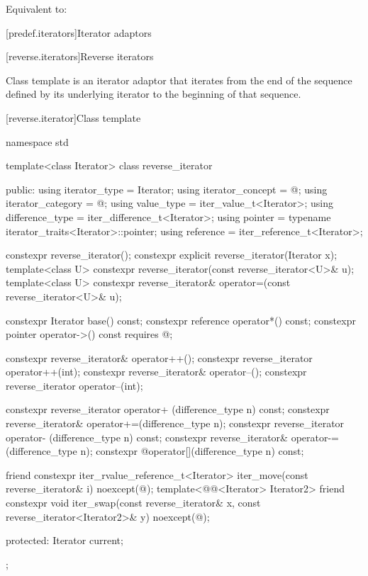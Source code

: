 \begin{itemdescr}
\pnum
\effects
Equivalent to: 
\end{itemdescr}

[predef.iterators]{Iterator adaptors}

[reverse.iterators]{Reverse iterators}

\pnum
Class template  is an iterator adaptor that iterates from the end of the sequence defined by its underlying iterator to the beginning of that sequence.

[reverse.iterator]{Class template }

%
\begin{codeblock}
namespace std {
  template<class Iterator>
  class reverse_iterator {
  public:
    using iterator_type     = Iterator;
    using iterator_concept  = @\seebelow@;
    using iterator_category = @\seebelow@;
    using value_type        = iter_value_t<Iterator>;
    using difference_type   = iter_difference_t<Iterator>;
    using pointer           = typename iterator_traits<Iterator>::pointer;
    using reference         = iter_reference_t<Iterator>;

    constexpr reverse_iterator();
    constexpr explicit reverse_iterator(Iterator x);
    template<class U> constexpr reverse_iterator(const reverse_iterator<U>& u);
    template<class U> constexpr reverse_iterator& operator=(const reverse_iterator<U>& u);

    constexpr Iterator base() const;
    constexpr reference operator*() const;
    constexpr pointer   operator->() const requires @\seebelow@;

    constexpr reverse_iterator& operator++();
    constexpr reverse_iterator  operator++(int);
    constexpr reverse_iterator& operator--();
    constexpr reverse_iterator  operator--(int);

    constexpr reverse_iterator  operator+ (difference_type n) const;
    constexpr reverse_iterator& operator+=(difference_type n);
    constexpr reverse_iterator  operator- (difference_type n) const;
    constexpr reverse_iterator& operator-=(difference_type n);
    constexpr @\unspec@ operator[](difference_type n) const;

    friend constexpr iter_rvalue_reference_t<Iterator>
      iter_move(const reverse_iterator& i) noexcept(@\seebelow@);
    template<@@<Iterator> Iterator2>
      friend constexpr void
        iter_swap(const reverse_iterator& x,
                  const reverse_iterator<Iterator2>& y) noexcept(@\seebelow@);

  protected:
    Iterator current;
  };
}
\end{codeblock}

